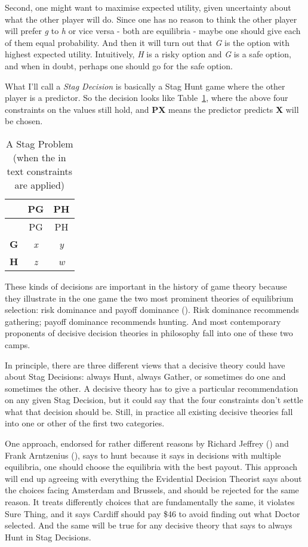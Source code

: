 \documentclass[
  11pt,
  letterpaper,
  DIV=11,
  numbers=noendperiod,
  twoside]{scrartcl}
\begin{document}
Second, one might want to maximise expected utility, given uncertainty
about what the other player will do. Since one has no reason to think
the other player will prefer \emph{g} to \emph{h} or vice versa - both
are equilibria - maybe one should give each of them equal probability.
And then it will turn out that \emph{G} is the option with highest
expected utility. Intuitively, \emph{H} is a risky option and \emph{G}
is a safe option, and when in doubt, perhaps one should go for the safe
option.

What I'll call a \emph{Stag Decision} is basically a Stag Hunt game
where the other player is a predictor. So the decision looks like
Table~\ref{tbl-stag-decision}, where the above four constraints on the
values still hold, and \textbf{PX} means the predictor predicts
\textbf{X} will be chosen.

\begin{longtable}[]{@{}lcc@{}}
\caption{A Stag Problem (when the in text constraints are
applied)}\label{tbl-stag-decision}\tabularnewline
\toprule\noalign{}
& PG & PH \\
\midrule\noalign{}
\endfirsthead
\toprule\noalign{}
& PG & PH \\
\midrule\noalign{}
\endhead
\bottomrule\noalign{}
\endlastfoot
\textbf{G} & \emph{x} & \emph{y} \\
\textbf{H} & \emph{z} & \emph{w} \\
\end{longtable}

These kinds of decisions are important in the history of game theory
because they illustrate in the one game the two most prominent theories
of equilibrium selection: risk dominance and payoff dominance
(). Risk
dominance recommends gathering; payoff dominance recommends hunting. And
most contemporary proponents of decisive decision theories in philosophy
fall into one of these two camps.

In principle, there are three different views that a decisive theory
could have about Stag Decisions: always Hunt, always Gather, or
sometimes do one and sometimes the other. A decisive theory has to give
a particular recommendation on any given Stag Decision, but it could say
that the four constraints don't settle what that decision should be.
Still, in practice all existing decisive theories fall into one or other
of the first two categories.

One approach, endorsed for rather different reasons by Richard Jeffrey
() and Frank Arntzenius
(), says to hunt because it says in
decisions with multiple equilibria, one should choose the equilibria
with the best payout. This approach will end up agreeing with everything
the Evidential Decision Theorist says about the choices facing Amsterdam
and Brussels, and should be rejected for the same reason. It treats
differently choices that are fundamentally the same, it violates Sure
Thing, and it says Cardiff should pay \$46 to avoid finding out what
Doctor selected. And the same will be true for any decisive theory that
says to always Hunt in Stag Decisions.
\end{document}
